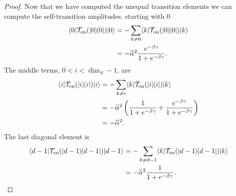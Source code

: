 \documentclass{article}
\newcommand{\on}{\rm on}
\newcommand{\ket}[1]{|#1\rangle}
\newcommand{\bra}[1]{\langle #1|}
\newcommand{\ketbra}[2]{| #1\rangle\! \langle #2|}
\begin{document}
\begin{proof}
Now that we have computed the unequal transition elements we can compute the self-transition amplitudes, starting with $0$
\begin{align}
    \bra{0} \mathcal{T}_{\on}(\ketbra{0}{0}) \ket{0} &= - \sum_{k \neq 0} \bra{k} \mathcal{T}_{\on}(\ketbra{0}{0}) \ket{k} \\
    &= - \widetilde{\alpha}^2 \frac{e^{-\beta \gamma}}{1 + e^{-\beta \gamma}}.
\end{align}
The middle terms, $0 < i < \dim_S - 1$, are 
\begin{align}
    \bra{i}\mathcal{T}_{\on}(\ketbra{i}{i}) \ket{i} &= - \sum_{k \neq i}  \bra{k} \mathcal{T}_{\on}(\ketbra{i}{i}) \ket{k} \\
    &= -\widetilde{\alpha}^2 \left( \frac{1}{1 + e^{-\beta \gamma}} + \frac{e^{-\beta \gamma}}{1 + e^{-\beta \gamma}} \right) \\
    &= -\widetilde{\alpha}^2.
\end{align}
The last diagonal element is
\begin{align}
    \bra{d - 1} \mathcal{T}_{\on}(\ketbra{d - 1}{d-1}) \ket{d - 1} &= - \sum_{k \neq d - 1} \bra{k} \mathcal{T}_{\on}(\ketbra{d-1}{d-1}) \ket{k} \\
    &= - \widetilde{\alpha}^2 \frac{1}{1 + e^{-\beta \gamma}}.
\end{align}


\end{proof}
\end{document}
